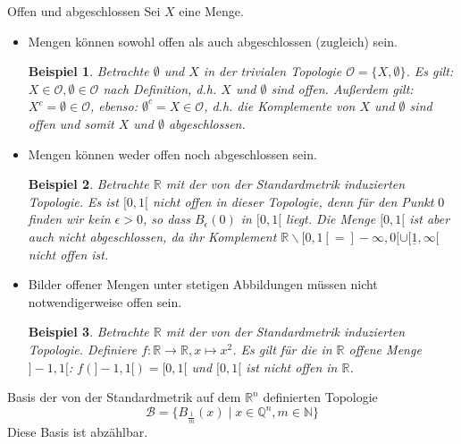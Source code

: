 \documentclass[a4paper,11pt,notitlepage]{report}
\newtheorem{example}{Beispiel}[chapter]
\newcommand{\R}{{\ensuremath{\mathbb{R}}}}
\newcommand{\N}{{\ensuremath{\mathbb{N}}}}
\newcommand{\Q}{{\ensuremath{\mathbb{Q}}}}
\newcommand{\OO}{{\ensuremath{\mathcal{O}}}}
\begin{document}
\begin{section}{Offen und abgeschlossen}
	Sei $X$ eine Menge.
	\begin{itemize}
		\item Mengen können sowohl offen als auch abgeschlossen (zugleich) sein.
			\begin{example}
				Betrachte $\emptyset$ und $X$ in der trivialen Topologie $\OO = \{X, \emptyset\}$.
					\newline
					Es gilt: $X \in \OO, \emptyset \in \OO$ nach Definition, d.h. $X$ und $\emptyset$ sind offen.
					\newline
					Außerdem gilt: $X^c = \emptyset \in \OO$, ebenso: $\emptyset^c = X \in \OO$, d.h. die Komplemente von $X$ und $\emptyset$ sind offen und somit $X$ und $\emptyset$ abgeschlossen.
			\end{example}
			
		\item Mengen können weder offen noch abgeschlossen sein.
			\begin{example}
				Betrachte $\R$ mit der von der Standardmetrik induzierten Topologie. Es ist $[0,1[$ nicht offen in dieser Topologie, denn für den Punkt $0$ finden wir kein $\epsilon > 0$, so dass $B_\epsilon(0)$ in $[0,1[$ liegt.
				Die Menge $[0,1[$ ist aber auch nicht abgeschlossen, da ihr Komplement $\R \backslash [0,1[ = ]-\infty,0[ \cup [\underline{1},\infty[$ nicht offen ist.
			\end{example}
		\item Bilder offener Mengen unter stetigen Abbildungen müssen nicht notwendigerweise offen sein.
			\begin{example}
				Betrachte $\R$ mit der von der Standardmetrik induzierten Topologie.
				\newline
				Definiere $f \colon \R \rightarrow \R, x \mapsto x^2$.
				\newline
				Es gilt für die in $\R$ offene Menge $]-1,1[$:
				\newline
				$f(]-1,1[)=[0,1[$ und $[0,1[$ ist nicht offen in $\R$.
			\end{example}
	\end{itemize}
\end{section}

\begin{section}{Basis der von der Standardmetrik auf dem $\R^n$ definierten Topologie}
	$$\mathcal{B} = \{B_{\frac{1}{m}}(x) \mid x \in \Q^n, m \in \N\}$$
	Diese Basis ist abzählbar.
\end{section}
\end{document}
